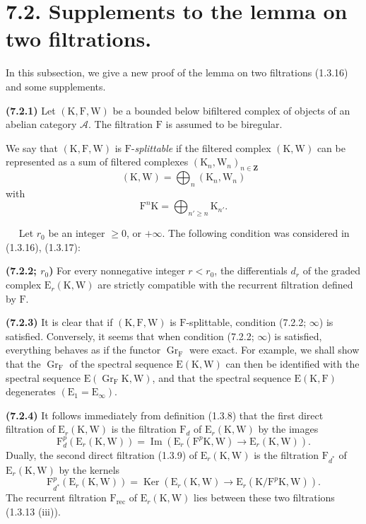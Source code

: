 \documentclass[11pt,leqno]{article}
\newcommand{\Page}[1]{\ifvmode\noindent\else\unskip\ \fi{\footnotesize\textcolor{gray}{[p.\,#1]}}\ \ignorespaces}
\begin{document}
\section*{7.2. Supplements to the lemma on two filtrations.}

In this subsection, we give a new proof of the lemma on two filtrations (1.3.16) and some supplements.

\textbf{(7.2.1)} Let \((\mathrm{K},\mathrm{F},\mathrm{W})\) be a bounded below bifiltered complex of objects of an abelian category \(\mathscr{A}\). The filtration \(\mathrm{F}\) is assumed to be biregular.

We say that \((\mathrm{K},\mathrm{F},\mathrm{W})\) is \(\mathrm{F}\)-\textit{splittable} if the filtered complex \((\mathrm{K},\mathrm{W})\) can be represented as a sum of filtered complexes \((\mathrm{K}_n,\mathrm{W}_n)_{n\in\mathbf{Z}}\)
\[
(\mathrm{K},\mathrm{W})=\bigoplus_n(\mathrm{K}_n,\mathrm{W}_n)
\]
with
\[
\mathrm{F}^{n}\mathrm{K}=\bigoplus_{n'\geq n}\mathrm{K}_{n'}.
\]

\Page{26}
Let \(r_0\) be an integer \(\geq 0\), or \(+\infty\). The following condition was considered in (1.3.16), (1.3.17):

\textbf{(7.2.2; \(r_0\))} For every nonnegative integer \(r<r_0\), the differentials \(d_r\) of the graded complex \(\mathrm{E}_r(\mathrm{K},\mathrm{W})\) are strictly compatible with the recurrent filtration defined by \(\mathrm{F}\).

\textbf{(7.2.3)} It is clear that if \((\mathrm{K},\mathrm{F},\mathrm{W})\) is \(\mathrm{F}\)-splittable, condition (7.2.2; \(\infty\)) is satisfied. Conversely, it seems that when condition (7.2.2; \(\infty\)) is satisfied, everything behaves as if the functor \(\operatorname{Gr}_{\mathrm{F}}\) were exact. For example, we shall show that the \(\operatorname{Gr}_{\mathrm{F}}\) of the spectral sequence \(\mathrm{E}(\mathrm{K},\mathrm{W})\) can then be identified with the spectral sequence \(\mathrm{E}(\operatorname{Gr}_{\mathrm{F}}\mathrm{K},\mathrm{W})\), and that the spectral sequence \(\mathrm{E}(\mathrm{K},\mathrm{F})\) degenerates \((\mathrm{E}_1=\mathrm{E}_{\infty})\).

\textbf{(7.2.4)} It follows immediately from definition (1.3.8) that the first direct filtration of \(\mathrm{E}_r(\mathrm{K},\mathrm{W})\) is the filtration \(\mathrm{F}_d\) of \(\mathrm{E}_r(\mathrm{K},\mathrm{W})\) by the images
\[
\mathrm{F}_d^p(\mathrm{E}_r(\mathrm{K},\mathrm{W}))
=\operatorname{Im}(\mathrm{E}_r(\mathrm{F}^p\mathrm{K},\mathrm{W})
\to\mathrm{E}_r(\mathrm{K},\mathrm{W})).
\]
Dually, the second direct filtration (1.3.9) of \(\mathrm{E}_r(\mathrm{K},\mathrm{W})\) is the filtration \(\mathrm{F}_{d^{*}}\) of \(\mathrm{E}_r(\mathrm{K},\mathrm{W})\) by the kernels
\[
\mathrm{F}_{d^{*}}^p(\mathrm{E}_r(\mathrm{K},\mathrm{W}))
=\operatorname{Ker}(\mathrm{E}_r(\mathrm{K},\mathrm{W})
\to\mathrm{E}_r(\mathrm{K}/\mathrm{F}^p\mathrm{K},\mathrm{W})).
\]
The recurrent filtration \(\mathrm{F}_{\mathrm{rec}}\) of \(\mathrm{E}_r(\mathrm{K},\mathrm{W})\) lies between these two filtrations (1.3.13 (iii)).
\end{document}
